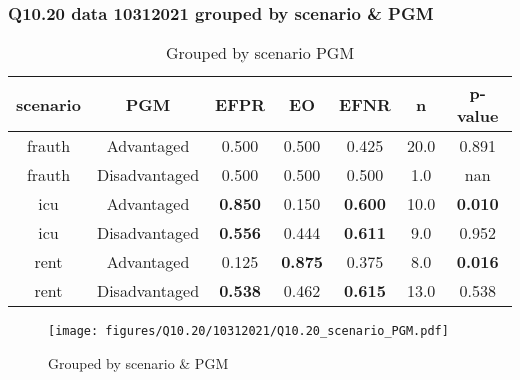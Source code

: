 \subsubsection{Q10.20 data 10312021 grouped by scenario \& PGM}

\begin{comment}
                             EFPR        EO      EFNR     n    pvalue
(frauth, Advantaged)     0.500000  0.500000  0.425000  20.0  0.890746
(frauth, Disadvantaged)  0.500000  0.500000  0.500000   1.0       NaN
(icu, Advantaged)        0.850000  0.150000  0.600000  10.0  0.010220
(icu, Disadvantaged)     0.555556  0.444444  0.611111   9.0  0.951739
(rent, Advantaged)       0.125000  0.875000  0.375000   8.0  0.016377
(rent, Disadvantaged)    0.538462  0.461538  0.615385  13.0  0.537596
\end{comment}

\begin{table}[h]
    \centering
    \begin{tabular}{|c|c|c|c|c|c|c|}
        \hline
        scenario & PGM & EFPR & EO & EFNR & n & p-value\\
        \hline
        frauth & Advantaged & 0.500 & 0.500 & 0.425 & 20.0 & 0.891\\
		frauth & Disadvantaged & 0.500 & 0.500 & 0.500 & 1.0 & nan\\
		icu & Advantaged & \textbf{0.850} & 0.150 & \textbf{0.600} & 10.0 & \textbf{0.010}\\
		icu & Disadvantaged & \textbf{0.556} & 0.444 & \textbf{0.611} & 9.0 & 0.952\\
		rent & Advantaged & 0.125 & \textbf{0.875} & 0.375 & 8.0 & \textbf{0.016}\\
		rent & Disadvantaged & \textbf{0.538} & 0.462 & \textbf{0.615} & 13.0 & 0.538\\
		
        \hline
    \end{tabular}
    \caption{Grouped by scenario PGM}
    \label{tab:my_label}
\end{table}
\begin{figure}[h]
    \centering
    \texttt{[image: figures/Q10.20/10312021/Q10.20\_scenario\_PGM.pdf]}
    \caption{Grouped by scenario \& PGM}
    \label{fig:my_label}
\end{figure}
